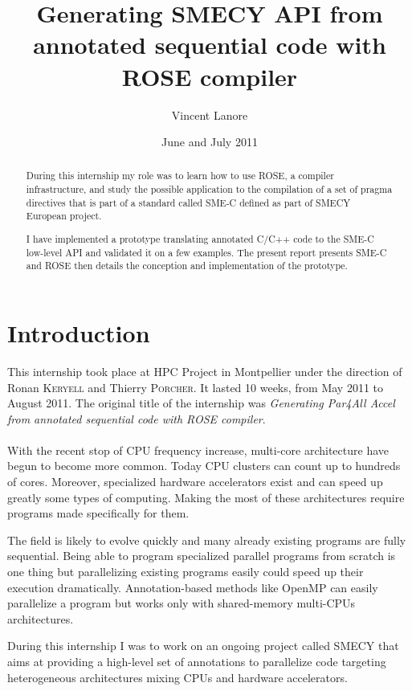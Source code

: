\documentclass[a4paper]{article}
\title{Generating SMECY API from annotated sequential code with ROSE compiler}
\author{Vincent \sc Lanore}
\date{June and July 2011}
\begin{document}
	\maketitle
	
	\begin{abstract}
		During this internship my role was to learn how to use ROSE, a
        compiler infrastructure, and study the possible application to the
        compilation of a set of pragma directives that is part of a
        standard called SME-C defined as part of SMECY European project.
		
		I have implemented a prototype translating annotated C/C++ code to the SME-C low-level API and validated it on a few examples. The present report presents SME-C and ROSE then details the conception and implementation of the prototype.
	\end{abstract}
	
	\newpage
	\tableofcontents
	\newpage
	
\section*{Introduction}
	This internship took place at HPC Project in Montpellier under the
    direction of Ronan \textsc{Keryell} and Thierry \textsc{Porcher}. It lasted 10 weeks, from May 2011 to August 2011. The original title of the internship was \emph{Generating Par4All Accel from annotated sequential code with ROSE compiler}.
	
	\paragraph{}With the recent stop of CPU frequency increase, multi-core architecture have begun to become more common. Today CPU clusters can count up to hundreds of cores. Moreover, specialized hardware accelerators exist and can speed up greatly some types of computing.  Making the most of these architectures require programs made specifically for them. 
	
	The field is likely to evolve quickly and many already existing programs are fully sequential. Being able to program specialized parallel programs from scratch is one thing but parallelizing existing programs easily could speed up their execution dramatically. Annotation-based methods like OpenMP can easily parallelize a program but works only with shared-memory multi-CPUs architectures.
	
	During this internship I was to work on an ongoing project called SMECY that aims at providing a high-level set of annotations to parallelize code targeting heterogeneous architectures mixing CPUs and hardware accelerators.
	
\end{document}
